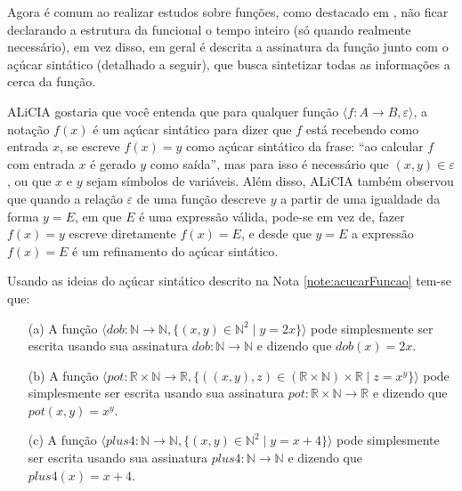 Agora é comum ao realizar estudos sobre funções, como destacado em \cite{carmo2013}, não ficar declarando a estrutura da funcional o tempo inteiro (só quando realmente necessário), em vez disso, em geral é descrita a assinatura da função junto com o açúcar sintático (detalhado a seguir), que busca sintetizar todas as informações a cerca da função.

\begin{nota}\label{note:acucarFuncao}
	ALiCIA gostaria que você entenda que para qualquer função  $\langle f: A \rightarrow B, \varepsilon \rangle$, a notação $f(x)$ é um açúcar sintático para dizer que $f$ está recebendo como entrada $x$, se escreve $f(x) = y$ como açúcar sintático da frase: ``ao calcular $f$ com entrada $x$ é gerado $y$ como saída'', mas para isso é necessário que $(x, y) \in \varepsilon$, ou que $x$ e $y$ sejam símbolos de variáveis. Além disso, ALiCIA também observou que quando a relação $\varepsilon$ de uma função descreve $y$ a partir de uma igualdade da forma $y = E$, em que $E$ é uma expressão válida, pode-se em vez de, fazer $f(x) = y$ escreve diretamente $f(x) = E$, e desde que $y = E$ a expressão $f(x) = E$ é um refinamento do açúcar sintático.
\end{nota}

\begin{exemplo}
	Usando as ideias do açúcar sintático descrito na Nota \ref{note:acucarFuncao} tem-se que:
	\begin{itemize}
		\item[(a)] A função  $\langle dob: \mathbb{N} \rightarrow  \mathbb{N},  \{(x, y) \in \mathbb{N}^2 \mid  y = 2x\} \rangle$ pode simplesmente ser escrita usando sua assinatura $dob:\mathbb{N} \rightarrow  \mathbb{N}$ e dizendo que $dob(x) = 2x$.
		\item[(b)] A função  $\langle pot: \mathbb{R} \times \mathbb{N} \rightarrow  \mathbb{R},  \{((x, y), z) \in (\mathbb{R} \times \mathbb{N}) \times \mathbb{R} \mid  z = x^y\} \rangle$ pode simplesmente ser escrita usando sua assinatura $pot: \mathbb{R} \times \mathbb{N} \rightarrow  \mathbb{R}$ e dizendo que $pot(x, y) = x^y$.
		\item[(c)] A função  $\langle plus4: \mathbb{N} \rightarrow  \mathbb{N},  \{(x, y) \in \mathbb{N}^2 \mid  y = x + 4\} \rangle$ pode simplesmente ser escrita usando sua assinatura $plus4:\mathbb{N} \rightarrow  \mathbb{N}$ e dizendo que $plus4(x) = x + 4$.
	\end{itemize}
\end{exemplo}

